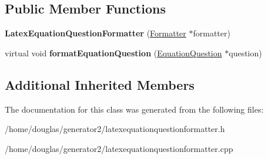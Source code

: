 \subsection*{Public Member Functions}
\begin{DoxyCompactItemize}
\item 
{\bfseries Latex\+Equation\+Question\+Formatter} (\hyperlink{classFormatter}{Formatter} $\ast$formatter)\hypertarget{classLatexEquationQuestionFormatter_abfc56460ec6befbb189b57f338513a4d}{}\label{classLatexEquationQuestionFormatter_abfc56460ec6befbb189b57f338513a4d}

\item 
virtual void {\bfseries format\+Equation\+Question} (\hyperlink{classEquationQuestion}{Equation\+Question} $\ast$question)\hypertarget{classLatexEquationQuestionFormatter_a8051f09e7bf9a8aeb732a49f7299c9cf}{}\label{classLatexEquationQuestionFormatter_a8051f09e7bf9a8aeb732a49f7299c9cf}

\end{DoxyCompactItemize}
\subsection*{Additional Inherited Members}


The documentation for this class was generated from the following files\+:\begin{DoxyCompactItemize}
\item 
/home/douglas/generator2/latexequationquestionformatter.\+h\item 
/home/douglas/generator2/latexequationquestionformatter.\+cpp\end{DoxyCompactItemize}

